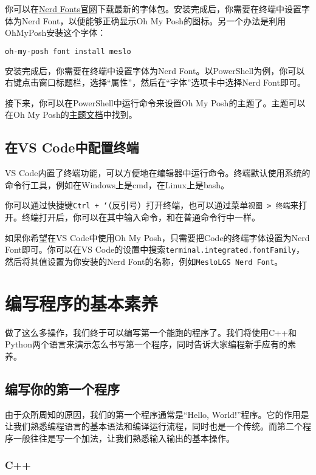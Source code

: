 \documentclass[../main.tex]{subfiles}
\begin{document}
你可以在\href{https://www.nerdfonts.com/}{Nerd Fonts官网}下载最新的字体包。安装完成后，你需要在终端中设置字体为Nerd Font，以便能够正确显示Oh My Posh的图标。另一个办法是利用OhMyPosh安装这个字体：
\begin{lstlisting}[language=bash]
  oh-my-posh font install meslo
\end{lstlisting}

安装完成后，你需要在终端中设置字体为Nerd Font。以PowerShell为例，你可以右键点击窗口标题栏，选择“属性”，然后在“字体”选项卡中选择Nerd Font即可。

接下来，你可以在PowerShell中运行命令来设置Oh My Posh的主题了。主题可以在Oh My Posh的\href{https://ohmyposh.dev/docs/themes}{主题文档}中找到。 

\subsection{在VS Code中配置终端}

VS Code内置了终端功能，可以方便地在编辑器中运行命令。终端默认使用系统的命令行工具，例如在Windows上是cmd，在Linux上是bash。

你可以通过快捷键\texttt{Ctrl + `}（反引号）打开终端，也可以通过菜单\texttt{视图 > 终端}来打开。终端打开后，你可以在其中输入命令，和在普通命令行中一样。

如果你希望在VS Code中使用Oh My Posh，只需要把Code的终端字体设置为Nerd Font即可。你可以在VS Code的设置中搜索\texttt{terminal.integrated.fontFamily}，然后将其值设置为你安装的Nerd Font的名称，例如\texttt{MesloLGS Nerd Font}。

\section{编写程序的基本素养}

做了这么多操作，我们终于可以编写第一个能跑的程序了。我们将使用C++和Python两个语言来演示怎么书写第一个程序，同时告诉大家编程新手应有的素养。

\subsection{编写你的第一个程序}

由于众所周知的原因，我们的第一个程序通常是“Hello, World!”程序。它的作用是让我们熟悉编程语言的基本语法和编译运行流程，同时也是一个传统。而第二个程序一般往往是写一个加法，让我们熟悉输入输出的基本操作。

\subsubsection{C++}
\end{document}
